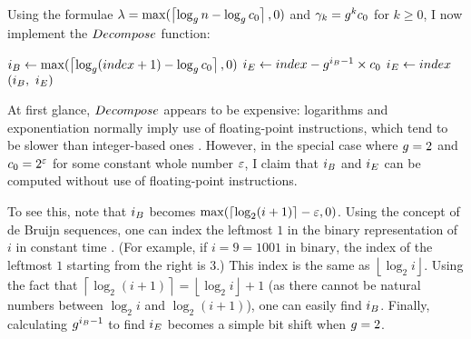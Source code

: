 Using the formulae $\lambda = \max(\left\lceil \log_{g} n - \log_{g} c_0 \right\rceil, 0)$ and $\gamma_k = g^k c_0$ for $k \geq 0$, I now implement the $\FuncDecompose$ function:

\begin{algorithm}[H]
	\caption{\TextHelperFunction}
	\begin{algorithmic}
		\Function{$\FuncDecompose$}{$\ParamIndex$}
			\State $i_B \gets \max(\left\lceil \log_{g} (index + 1) - \log_{g} c_0 \right\rceil, 0)$
				\State $i_E \gets index - g^{i_B - 1} \times c_0$
			\Else
				\State $i_E \gets index$
			\EndIf
			\State \Return $(\LclIndexBuffer,\ \LclIndexElement)$
		\EndFunction
	\end{algorithmic}
\end{algorithm}

At first glance, $\FuncDecompose$ appears to be expensive: logarithms and exponentiation normally imply use of floating-point instructions, which tend to be slower than integer-based ones \cite{fptables}. However, in the special case where $g = 2$ and $c_0 = 2^\varepsilon$ for some constant whole number $\varepsilon$, I claim that $i_B$ and $i_E$ can be computed without use of floating-point instructions.

To see this, note that $i_B$ becomes $\max(\left\lceil \log_2 (i + 1) \right\rceil - \varepsilon, 0)$. Using the concept of de Bruijn sequences, one can index the leftmost $1$ in the binary representation of $i$ in constant time \cite{ceillog2}. (For example, if $i = 9 = 1001\text{ in binary}$, the index of the leftmost $1$ starting from the right is $3$.) This index is the same as $\left\lfloor \log_2 i \right\rfloor$. Using the fact that $\left\lceil \log_2 (i + 1) \right\rceil = \left\lfloor \log_2 i \right\rfloor + 1$ (as there cannot be natural numbers between $\log_2 i$ and $\log_2 (i + 1)$), one can easily find $i_B$. Finally, calculating $g^{i_B - 1}$ to find $i_E$ becomes a simple bit shift when $g = 2$.